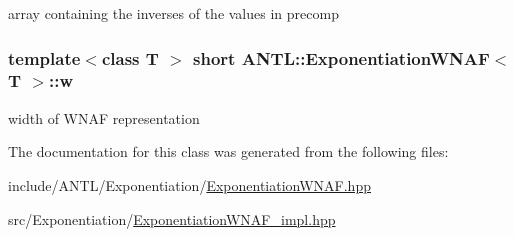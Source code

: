 array containing the inverses of the values in precomp \hypertarget{classANTL_1_1ExponentiationWNAF_aeeeaf680db26d52f56783a6a5a761066}{
\subsubsection[{w}]{\setlength{\rightskip}{0pt plus 5cm}template$<$class T $>$ short {\bf A\-N\-T\-L\-::\-Exponentiation\-W\-N\-A\-F}$<$ T $>$\-::w\hspace{0.3cm}{\ttfamily [protected]}}}\label{classANTL_1_1ExponentiationWNAF_aeeeaf680db26d52f56783a6a5a761066}
width of W\-N\-A\-F representation 

The documentation for this class was generated from the following files\-:\begin{DoxyCompactItemize}
\item 
include/\-A\-N\-T\-L/\-Exponentiation/\hyperlink{ExponentiationWNAF_8hpp}{Exponentiation\-W\-N\-A\-F.\-hpp}\item 
src/\-Exponentiation/\hyperlink{ExponentiationWNAF__impl_8hpp}{Exponentiation\-W\-N\-A\-F\-\_\-impl.\-hpp}\end{DoxyCompactItemize}
